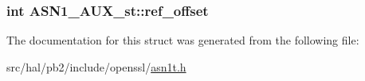 \subsubsection[{\texorpdfstring{ref\+\_\+offset}{ref_offset}}]{\setlength{\rightskip}{0pt plus 5cm}int A\+S\+N1\+\_\+\+A\+U\+X\+\_\+st\+::ref\+\_\+offset}\hypertarget{struct_a_s_n1___a_u_x__st_a7bf75280ea384bfda6f280e97a214f8a}{}\label{struct_a_s_n1___a_u_x__st_a7bf75280ea384bfda6f280e97a214f8a}


The documentation for this struct was generated from the following file\+:\begin{DoxyCompactItemize}
\item 
src/hal/pb2/include/openssl/\hyperlink{asn1t_8h}{asn1t.\+h}\end{DoxyCompactItemize}
